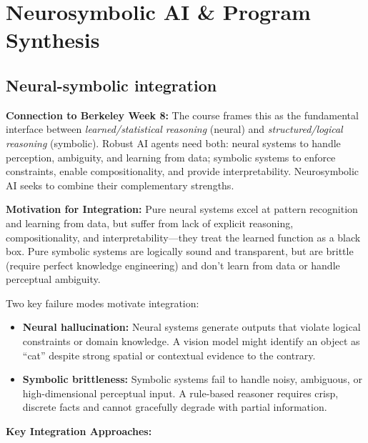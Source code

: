 
\section{Neurosymbolic AI \& Program Synthesis}

\subsection{Neural-symbolic integration}

\begin{intuitionbox}
\textbf{Connection to Berkeley Week 8:} The course frames this as the fundamental interface between \emph{learned/statistical reasoning} (neural) and \emph{structured/logical reasoning} (symbolic). Robust AI agents need both: neural systems to handle perception, ambiguity, and learning from data; symbolic systems to enforce constraints, enable compositionality, and provide interpretability. Neurosymbolic AI seeks to combine their complementary strengths.
\end{intuitionbox}

\textbf{Motivation for Integration:}
Pure neural systems excel at pattern recognition and learning from data, but suffer from lack of explicit reasoning, compositionality, and interpretability—they treat the learned function as a black box. Pure symbolic systems are logically sound and transparent, but are brittle (require perfect knowledge engineering) and don't learn from data or handle perceptual ambiguity.

Two key failure modes motivate integration:
\begin{itemize}
    \item \textbf{Neural hallucination:} Neural systems generate outputs that violate logical constraints or domain knowledge. A vision model might identify an object as ``cat'' despite strong spatial or contextual evidence to the contrary.
    \item \textbf{Symbolic brittleness:} Symbolic systems fail to handle noisy, ambiguous, or high-dimensional perceptual input. A rule-based reasoner requires crisp, discrete facts and cannot gracefully degrade with partial information.
\end{itemize}

\textbf{Key Integration Approaches:}

